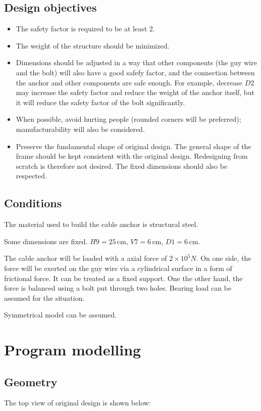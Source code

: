 \documentclass[a4paper,14pt]{extarticle}
\newcommand{\cm}{\,\si{\centi\meter}}
\begin{document}
\subsection{Design objectives}
\begin{itemize}
\item The safety factor is required to be at least 2. 
\item The weight of the structure should be minimized.
\item Dimensions should be adjusted in a way that other components (the guy wire and the bolt) will also have a good safefy factor, and the connection between the anchor and other components are safe enough. For example, decrease $D2$ may increase the safety factor and reduce the weight of the anchor itself, but it will reduce the safety factor of the bolt significantly.
\item When possible, avoid hurting people (rounded corners will be preferred); manufacturability will also be considered.
\item Preserve the fundamental shape of original design. The general shape of the frame should be kept consistent with the original design. Redesigning from scratch is therefore not desired. The fixed dimensions should also be respected. 
\end{itemize}

\subsection{Conditions}
The material used to build the cable anchor is structural steel.

Some dimensions are fixed. $H9=25\cm$, $V7=6\cm$, $D1 = 6\cm$.

The cable anchor will be loaded with a axial force of $2\times10^5 N$. On one side, the force will be exerted on the guy wire via a cylindrical surface in a form of frictional force. It can be treated as a fixed support. One the other hand, the force is balanced using a bolt put through two holes. Bearing load can be assumed for the situation.

Symmetrical model can be assumed. 
\section{Program modelling}
\subsection{Geometry}
The top view of original design is shown below:
\end{document}
